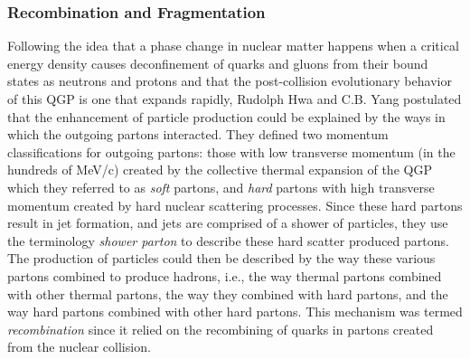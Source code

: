 \subsubsection{Recombination and Fragmentation}
Following the idea that a phase change in nuclear matter happens when a critical energy density causes deconfinement of quarks and gluons from their bound states as neutrons and protons and that the post-collision evolutionary behavior of this QGP is one that expands rapidly, Rudolph Hwa and C.B. Yang postulated that the enhancement of particle production could be explained by the ways in which the outgoing partons interacted\citep{PhysRevC.70.024905}. They defined two momentum classifications for outgoing partons: those with low transverse momentum (in the hundreds of MeV/c) created by the collective thermal expansion of the QGP which they referred to as \textit{soft} partons, and \textit{hard} partons with high transverse momentum created by hard nuclear scattering processes. Since these hard partons result in jet formation, and jets are comprised of a shower of particles, they use the terminology \textit{shower parton} to describe these hard scatter produced partons. The production of particles could then be described by the way these various partons combined to produce hadrons, i.e., the way thermal partons combined with other thermal partons, the way they combined with hard partons, and the way hard partons combined with other hard partons. This mechanism was termed \textit{recombination} since it relied on the recombining of quarks in partons created from the nuclear collision.

